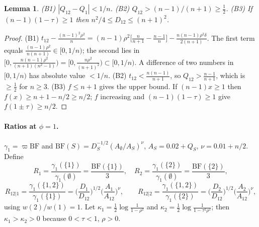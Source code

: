 \documentclass[11pt]{article}
\newtheorem{lemma}[theorem]{Lemma}
\theoremstyle{remark}
\newcommand{\BF}{\mathrm{BF}}
\begin{document}
\begin{lemma}\label{lem:bounds}
(B1) $|Q_{12}-Q_1|<1/n$. (B2) $Q_{12}>(n-1)/(n+1)\ge\tfrac12$. (B3) If $(n-1)(1-\tau)\ge1$ then $n^2/4\le D_{12}\le(n+1)^2$.
\end{lemma}
\begin{proof}
(B1) $t_{12}-\frac{(n-1)^2\rho^2}{n}=(n-1)\rho^2\big[\frac n{n+1}-\frac{n-1}n\big]-\frac{n(n-1)\rho^2\delta}{2(n+1)}$. The first term equals $\frac{(n-1)\rho^2}{n(n+1)}\in[0,1/n)$; the second lies in $[0,\frac{n(n-1)\rho^2}{(n+1)(n^2-1)})=[0,\frac{n\rho^2}{(n+1)^2})\subset[0,1/n)$. A difference of two numbers in $[0,1/n)$ has absolute value $<1/n$. (B2) $t_{12}<\frac{n(n-1)}{n+1}$, so $Q_{12}>\frac{n-1}{n+1}$, which is $\ge\frac12$ for $n\ge3$. (B3) $f\le n+1$ gives the upper bound. If $(n-1)x\ge1$ then $f(x)\ge n+1-n/2\ge n/2$; $f$ increasing and $(n-1)(1-\tau)\ge1$ give $f(1\pm\tau)\ge n/2$.
\end{proof}

\paragraph{Ratios at $\phi=1$.} $\gamma_1=\varpi\BF$ and $\BF(S)=D_S^{-1/2}(A_\emptyset/A_S)^\nu$, $A_S=0.02+Q_S$, $\nu=0.01+n/2$. Define
\[R_1=\frac{\gamma_1(\{1\})}{\gamma_1(\emptyset)}=\frac{\BF(\{1\})}3,\quad R_2=\frac{\gamma_1(\{2\})}{\gamma_1(\emptyset)}=\frac{\BF(\{2\})}3,\]
\[R_{12|1}=\frac{\gamma_1(\{1,2\})}{\gamma_1(\{1\})}=\Big(\frac{D_1}{D_{12}}\Big)^{1/2}\Big(\frac{A_1}{A_{12}}\Big)^\nu,\qquad R_{12|2}=\frac{\gamma_1(\{1,2\})}{\gamma_1(\{2\})}=\Big(\frac{D_2}{D_{12}}\Big)^{1/2}\Big(\frac{A_2}{A_{12}}\Big)^\nu,\]
using $w(2)/w(1)=1$. Let $\kappa_1=\tfrac12\log\frac1{1-\rho^2}$ and $\kappa_2=\tfrac12\log\frac1{1-\tau^2\rho^2}$; then $\kappa_1>\kappa_2>0$ because $0<\tau<1$, $\rho>0$.
\end{document}
